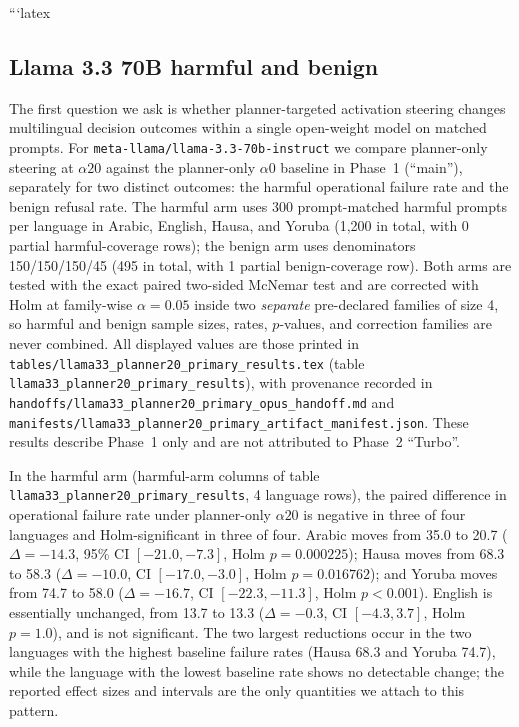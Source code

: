 ```latex
\subsection{Llama 3.3 70B harmful and benign}

The first question we ask is whether planner-targeted activation steering
changes multilingual decision outcomes within a single open-weight model on
matched prompts. For \texttt{meta-llama/llama-3.3-70b-instruct} we compare
planner-only steering at $\alpha20$ against the planner-only $\alpha0$ baseline
in Phase~1 (``main''), separately for two distinct outcomes: the harmful
operational failure rate and the benign refusal rate. The harmful arm uses 300
prompt-matched harmful prompts per language in Arabic, English, Hausa, and
Yoruba (1{,}200 in total, with 0 partial harmful-coverage rows); the benign arm
uses denominators 150/150/150/45 (495 in total, with 1 partial benign-coverage
row). Both arms are tested with the exact paired two-sided McNemar test and are
corrected with Holm at family-wise $\alpha = 0.05$ inside two \emph{separate}
pre-declared families of size 4, so harmful and benign sample sizes, rates,
$p$-values, and correction families are never combined. All displayed values are
those printed in \texttt{tables/llama33\_planner20\_primary\_results.tex}
(table \texttt{llama33\_planner20\_primary\_results}), with provenance recorded
in \texttt{handoffs/llama33\_planner20\_primary\_opus\_handoff.md} and
\texttt{manifests/llama33\_planner20\_primary\_artifact\_manifest.json}. These
results describe Phase~1 only and are not attributed to Phase~2 ``Turbo''.

In the harmful arm (harmful-arm columns of table
\texttt{llama33\_planner20\_primary\_results}, 4 language rows), the paired
difference in operational failure rate under planner-only $\alpha20$ is negative
in three of four languages and Holm-significant in three of four. Arabic moves
from 35.0 to 20.7 ($\Delta = -14.3$, 95\% CI $[-21.0, -7.3]$, Holm
$p = 0.000225$); Hausa moves from 68.3 to 58.3 ($\Delta = -10.0$, CI
$[-17.0, -3.0]$, Holm $p = 0.016762$); and Yoruba moves from 74.7 to 58.0
($\Delta = -16.7$, CI $[-22.3, -11.3]$, Holm $p < 0.001$). English is
essentially unchanged, from 13.7 to 13.3 ($\Delta = -0.3$, CI $[-4.3, 3.7]$,
Holm $p = 1.0$), and is not significant. The two largest reductions occur in the
two languages with the highest baseline failure rates (Hausa 68.3 and Yoruba
74.7), while the language with the lowest baseline rate shows no detectable
change; the reported effect sizes and intervals are the only quantities we
attach to this pattern.

